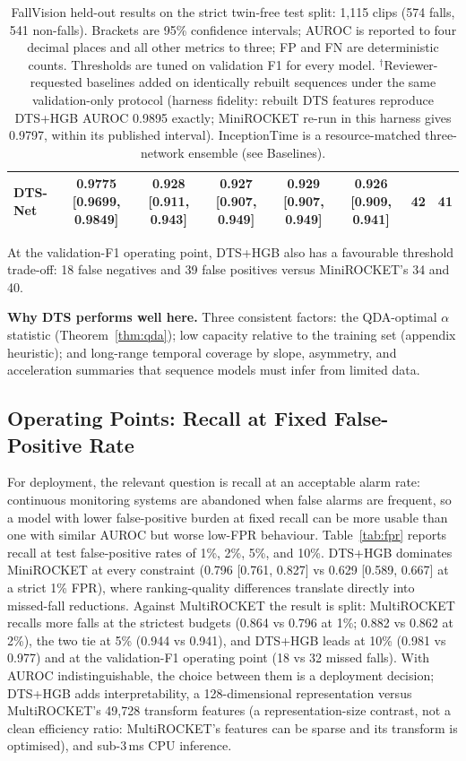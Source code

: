 \begin{table}[t]
\begin{tabular}{lccccccc}
DTS-Net & 0.9775 [0.9699, 0.9849] & 0.928 [0.911, 0.943] & 0.927 [0.907, 0.949] & 0.929 [0.907, 0.949] & 0.926 [0.909, 0.941] & 42 & 41 \\
\bottomrule
\end{tabular}
\caption{FallVision held-out results on the strict twin-free test split: 1,115 clips (574 falls, 541 non-falls). Brackets are 95\% confidence intervals; AUROC is reported to four decimal places and all other metrics to three; FP and FN are deterministic counts. Thresholds are tuned on validation F1 for every model. $^{\dagger}$Reviewer-requested baselines added on identically rebuilt sequences under the same validation-only protocol (harness fidelity: rebuilt DTS features reproduce DTS+HGB AUROC 0.9895 exactly; MiniROCKET re-run in this harness gives 0.9797, within its published interval). InceptionTime is a resource-matched three-network ensemble (see Baselines).}
\label{tab:main}
\end{table}

At the validation-F1 operating point, DTS+HGB also has a favourable threshold trade-off: 18 false negatives and 39 false positives versus MiniROCKET's 34 and 40.

\textbf{Why DTS performs well here.} Three consistent factors: the QDA-optimal $\alpha$ statistic (Theorem~\ref{thm:qda}); low capacity relative to the training set (appendix heuristic); and long-range temporal coverage by slope, asymmetry, and acceleration summaries that sequence models must infer from limited data.

\subsection{Operating Points: Recall at Fixed False-Positive Rate}
For deployment, the relevant question is recall at an acceptable alarm rate: continuous monitoring systems are abandoned when false alarms are frequent, so a model with lower false-positive burden at fixed recall can be more usable than one with similar AUROC but worse low-FPR behaviour. Table~\ref{tab:fpr} reports recall at test false-positive rates of 1\%, 2\%, 5\%, and 10\%. DTS+HGB dominates MiniROCKET at every constraint (0.796 [0.761, 0.827] vs 0.629 [0.589, 0.667] at a strict 1\% FPR), where ranking-quality differences translate directly into missed-fall reductions. Against MultiROCKET the result is split: MultiROCKET recalls more falls at the strictest budgets (0.864 vs 0.796 at 1\%; 0.882 vs 0.862 at 2\%), the two tie at 5\% (0.944 vs 0.941), and DTS+HGB leads at 10\% (0.981 vs 0.977) and at the validation-F1 operating point (18 vs 32 missed falls). With AUROC indistinguishable, the choice between them is a deployment decision; DTS+HGB adds interpretability, a 128-dimensional representation versus MultiROCKET's 49,728 transform features (a representation-size contrast, not a clean efficiency ratio: MultiROCKET's features can be sparse and its transform is optimised), and sub-3\,ms CPU inference.

